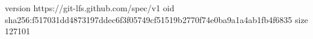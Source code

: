 version https://git-lfs.github.com/spec/v1
oid sha256:f517031dd4873197ddec6f3f05749cf51519b2770f74e0ba9a1a4ab1fb4f6835
size 127101
